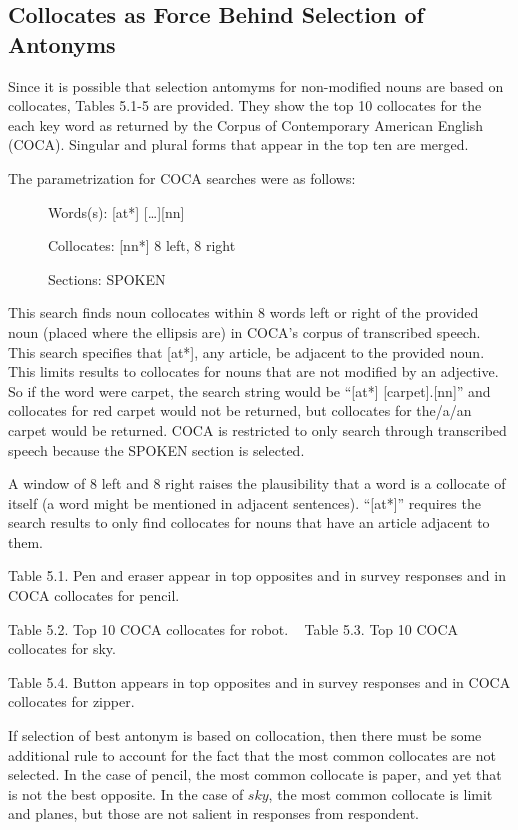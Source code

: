 \subsection {Collocates as Force Behind Selection of Antonyms} Since it is possible that selection antomyms for non-modified nouns are based on collocates, Tables 5.1-5 are provided.  They show the top 10 collocates for the each key word as returned by the Corpus of Contemporary American English (COCA).  Singular and plural forms that appear in the top ten are merged.  

The parametrization for COCA searches were as follows:
\begin {description}
	\item[] Words(s): 	[at*] [\ldots][nn]
	\item[] Collocates: 	[nn*] 8 left, 8 right
	\item[] Sections: 	SPOKEN
\end {description}

This search finds noun collocates within 8 words left or right of the provided noun (placed where the ellipsis are) in COCA’s corpus of transcribed speech.  This search specifies that [at*], any article, be adjacent to the provided noun.  This limits results to collocates for nouns that are not modified by an adjective.  So if the word were carpet, the search string would be “[at*] [carpet].[nn]” and collocates for red carpet would not be returned, but collocates for the/a/an carpet would be returned.  COCA is restricted to only search through transcribed speech because the SPOKEN section is selected.

A window of 8 left and 8 right raises the plausibility that a word is a collocate of itself (a word might be mentioned in adjacent sentences).  “[at*]” requires the search results to only find collocates for nouns that have an article adjacent to them.  

	Table 5.1. Pen and eraser appear in top opposites and in survey responses and in COCA collocates for pencil.

	Table 5.2. Top 10 COCA collocates for robot.
	 
	Table 5.3. Top 10 COCA collocates for sky.

	Table 5.4. Button appears in top opposites and in survey responses and in COCA collocates for zipper.

If selection of best antonym is based on collocation, then there must be some additional rule to account for the fact that the most common collocates are not selected.  In the case of pencil, the most common collocate is paper, and yet that is not the best opposite.  In the case of $sky$, the most common collocate is limit and planes, but those are not salient in responses from respondent.  